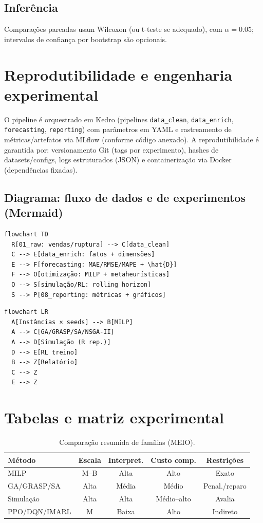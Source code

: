 \subsection{Inferência}
Comparações pareadas usam Wilcoxon (ou t-teste se adequado), com \(\alpha=0.05\); intervalos de confiança por bootstrap são opcionais. \cite{Law2015SimulationModeling}

\section{Reprodutibilidade e engenharia experimental}
O pipeline é orquestrado em Kedro (pipelines \texttt{data\_clean}, \texttt{data\_enrich}, \texttt{forecasting}, \texttt{reporting}) com parâmetros em YAML e rastreamento de métricas/artefatos via MLflow (conforme código anexado). A reprodutibilidade é garantida por: versionamento Git (tags por experimento), hashes de datasets/configs, logs estruturados (JSON) e containerização via Docker (dependências fixadas).

\subsection*{Diagrama: fluxo de dados e de experimentos (Mermaid)}
\begin{verbatim}
flowchart TD
  R[01_raw: vendas/ruptura] --> C[data_clean]
  C --> E[data_enrich: fatos + dimensões]
  E --> F[forecasting: MAE/RMSE/MAPE + \hat{D}]
  F --> O[otimização: MILP + metaheurísticas]
  O --> S[simulação/RL: rolling horizon]
  S --> P[08_reporting: métricas + gráficos]
\end{verbatim}

\begin{verbatim}
flowchart LR
  A[Instâncias × seeds] --> B[MILP]
  A --> C[GA/GRASP/SA/NSGA-II]
  A --> D[Simulação (R rep.)]
  D --> E[RL treino]
  B --> Z[Relatório]
  C --> Z
  E --> Z
\end{verbatim}

\section{Tabelas e matriz experimental}
\begin{table}[htbp]\centering\small
\begin{tabular}{lcccc}
\hline
Método & Escala & Interpret. & Custo comp. & Restrições \\
\hline
MILP & M--B & Alta & Alto & Exato \\
GA/GRASP/SA & Alta & Média & Médio & Penal./reparo \\
Simulação & Alta & Alta & Médio--alto & Avalia \\
PPO/DQN/IMARL & M & Baixa & Alto & Indireto \\
\hline
\end{tabular}
\caption{Comparação resumida de famílias (MEIO).}\label{tab:met_comp}
\end{table}

